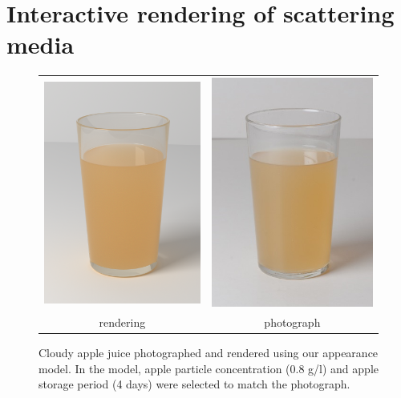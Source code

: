\section{Interactive rendering of scattering media}
\begin{figure}
\begin{tabular}{@{}c@{}c@{}}
	 \includegraphics[width=0.5\columnwidth]{figures/teaser_render.png} &
	 \includegraphics[width=0.5\columnwidth]{figures/ref_img.jpg}  \\
	rendering & photograph \\
\end{tabular}
\caption{Cloudy apple juice photographed and rendered using our appearance model. In the model, apple particle concentration (0.8 g/l) and apple storage period (4 days) were selected to match the photograph.} %
\label{fig:teaser}
\end{figure}


